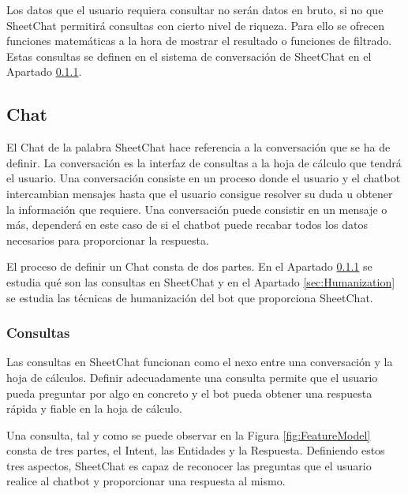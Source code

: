 Los datos que el usuario requiera consultar no serán datos en bruto, si no que SheetChat permitirá consultas con cierto nivel de riqueza. Para ello se ofrecen funciones matemáticas a la hora de mostrar el resultado o funciones de filtrado. Estas consultas se definen en el sistema de conversación de SheetChat en el Apartado \ref{sec:Queries}.

\subsection{Chat}
\label{sec:Chat}

El Chat de la palabra SheetChat hace referencia a la conversación que se ha de definir. La conversación es la interfaz de consultas a la hoja de cálculo que tendrá el usuario. Una conversación consiste en un proceso donde el usuario y el chatbot intercambian mensajes hasta que el usuario consigue resolver su duda u obtener la información que requiere. Una conversación puede consistir en un mensaje o más, dependerá en este caso de si el chatbot puede recabar todos los datos necesarios para proporcionar la respuesta.

El proceso de definir un Chat consta de dos partes. En el Apartado \ref{sec:Queries} se estudia qué son las consultas en SheetChat y en el Apartado \ref{sec:Humanization} se estudia las técnicas de humanización del bot que proporciona SheetChat.

\subsubsection{Consultas}
\label{sec:Queries}

Las consultas en SheetChat funcionan como el nexo entre una conversación y la hoja de cálculos. Definir adecuadamente una consulta permite que el usuario pueda preguntar por algo en concreto y el bot pueda obtener una respuesta rápida y fiable en la hoja de cálculo.

Una consulta, tal y como se puede observar en la Figura \ref{fig:FeatureModel} consta de tres partes, el Intent, las Entidades y la Respuesta. Definiendo estos tres aspectos, SheetChat es capaz de reconocer las preguntas que el usuario realice al chatbot y proporcionar una respuesta al mismo.

